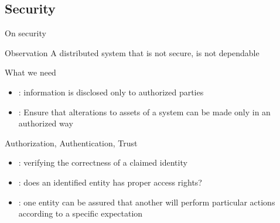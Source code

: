 \subsection{Security}
\begin{slide}{On security}
  \begin{alertblock}{Observation}
    A distributed system that is not secure, is not dependable
  \end{alertblock}
  \onslide
  \begin{block}{What we need}
    \begin{itemize}\firmlist
    \item {}: information is disclosed only to authorized parties
    \item {}: Ensure that alterations to assets of a system can be made only in an authorized way
    \end{itemize}
  \end{block}
  \onslide
  \begin{block}{Authorization, Authentication, Trust}
    \begin{itemize}\firmlist
    \item {}: verifying the correctness of a claimed identity
    \item {}: does an identified entity has proper access rights?
      \item {}: one entity can be assured that another will perform particular actions
        according to a specific expectation
    \end{itemize}
  \end{block}
\end{slide}
